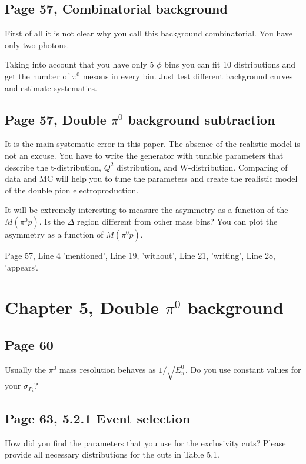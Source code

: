 \documentclass[11pt]{paper}
\begin{document}
\subsection*{Page 57, Combinatorial background}

First of all it is not clear why you call this background combinatorial. You have only two photons.

Taking into account that you have only 5 $\phi$ bins you can  fit 10 distributions and get the number of  $\pi^0$ mesons in every bin. Just test different background curves and estimate systematics. 

\subsection*{Page 57, Double $\pi^0$ background subtraction}

It is the main systematic error in this paper. The absence of the realistic model is not an excuse. 
You have to write the generator with tunable parameters that describe the t-distribution, $Q^2$ distribution, and W-distribution.
Comparing of data and MC will help you to tune the parameters and create the realistic model of the
double pion electroproduction.

It will be extremely interesting to measure the asymmetry as a function of the $M(\pi^0p)$. Is the $\Delta$ region different from other mass bins? You can plot the asymmetry as a function of $M(\pi^0p)$.

Page 57, Line 4 'mentioned', Line 19, 'without', Line 21, 'writing', Line 28, 'appears'.

\section*{Chapter 5, Double $\pi^0$ background}

\subsection*{Page 60}
Usually the $\pi^0$ mass resolution behaves as $1/\sqrt{E_\pi^0}$. Do you use constant values for your 
$\sigma_{P_i}$?  

\subsection*{Page 63, 5.2.1 Event selection}

How did you find the parameters that you use for the exclusivity cuts?
Please provide all necessary distributions for the cuts in Table 5.1.
\end{document}
